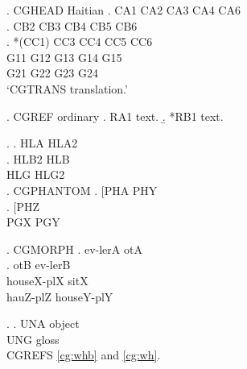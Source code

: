 

\ex.\label{cg:wh} CGHEAD Haitian
\ag. \ok CA1 CA2 CA3 CA4 {} CA6 \\
\bg.\label{cg:whb} \ok {} CB2 CB3 CB4 CB5 CB6 \\
\cg. *(CC1) {} CC3 CC4 CC5 CC6 \\
\CommonGloss G11 G12 G13 G14 G15\\
\CommonGloss G21 G22 G23 G24\\
\glt `CGTRANS translation.'

\ex. CGREF ordinary
\a. \ok RA1 text.
\b. *RB1 text.

\ex.\label{cg:hl}
\ag. HLA HLA2\\
\bg. HLB2 HLB\\
\CommonGloss HLG HLG2\\

{\GlossPhantomAlign
\ex. CGPHANTOM
\ag. [PHA PHY\\
\bg. {} [PHZ\\
\CommonGloss PGX PGY\\
}

{\GlossMorphAlign
\ex. CGMORPH
\ag. ev-lerA otA\\
\bg. otB ev-lerB\\
\CommonGloss houseX-plX sitX\\
\CommonGloss hauZ-plZ houseY-plY\\
}

\ex. \ag. UNA object\\
UNG gloss\\

CGREFS \ref{cg:whb} and \ref{cg:wh}.

